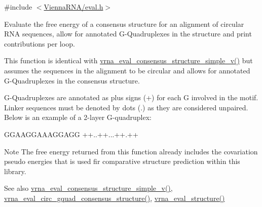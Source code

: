 {\ttfamily \#include $<$\mbox{\hyperlink{eval_8h}{Vienna\+R\+N\+A/eval.\+h}}$>$}



Evaluate the free energy of a consensus structure for an alignment of circular R\+NA sequences, allow for annotated G-\/\+Quadruplexes in the structure and print contributions per loop. 

This function is identical with \mbox{\hyperlink{group__eval_gad88927c62ab0a8b534e078e44be1b36e}{vrna\+\_\+eval\+\_\+consensus\+\_\+structure\+\_\+simple\+\_\+v()}} but assumes the sequences in the alignment to be circular and allows for annotated G-\/\+Quadruplexes in the consensus structure.

G-\/\+Quadruplexes are annotated as plus signs (\textquotesingle{}+\textquotesingle{}) for each G involved in the motif. Linker sequences must be denoted by dots (\textquotesingle{}.\textquotesingle{}) as they are considered unpaired. Below is an example of a 2-\/layer G-\/quadruplex\+: 
\begin{DoxyCode}
GGAAGGAAAGGAGG
++..++...++.++
\end{DoxyCode}


\begin{DoxyNote}{Note}
The free energy returned from this function already includes the covariation pseudo energies that is used fir comparative structure prediction within this library.
\end{DoxyNote}
\begin{DoxySeeAlso}{See also}
\mbox{\hyperlink{group__eval_gad88927c62ab0a8b534e078e44be1b36e}{vrna\+\_\+eval\+\_\+consensus\+\_\+structure\+\_\+simple\+\_\+v()}}, \mbox{\hyperlink{group__eval_gac673ebb9ae2a29f54d201e2ac5b85540}{vrna\+\_\+eval\+\_\+circ\+\_\+gquad\+\_\+consensus\+\_\+structure()}}, \mbox{\hyperlink{group__eval_ga58f199f1438d794a265f3b27fc8ea631}{vrna\+\_\+eval\+\_\+structure()}}
\end{DoxySeeAlso}

